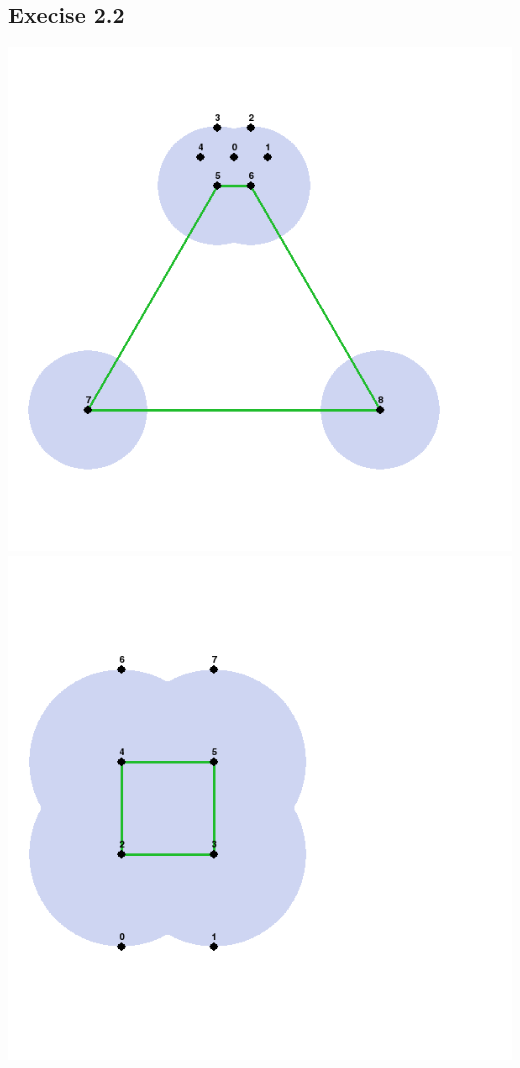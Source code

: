 \documentclass[11pt,a4paper]{article}
\begin{document}
\subsection{Execise 2.2}
\includegraphics[width=\textwidth]{graph1.png}
\includegraphics[width=\textwidth]{graph2.png}
\end{document}
